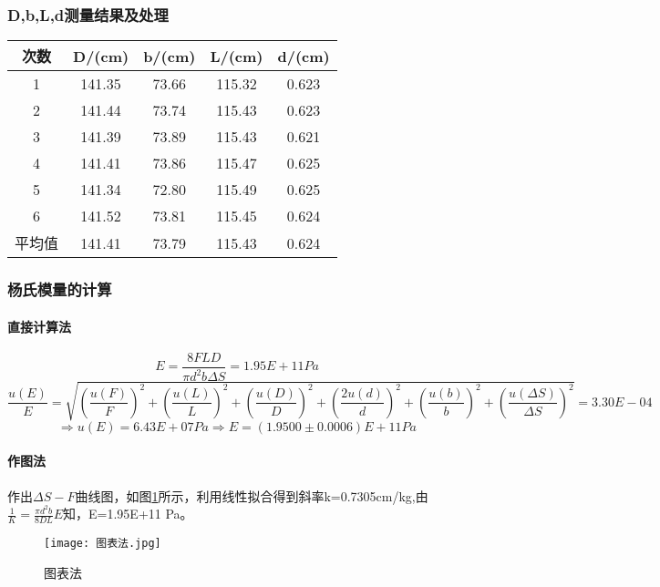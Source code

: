 \documentclass[]{../template/Report}%
\begin{document}
\begin{fullreportonly}
\subsubsection{D,b,L,d测量结果及处理}
	\begin{table}[H]
		\centering
		\label{tab:exp_data}
		\begin{tabular}{|c|c|c|c|c|}
			\hline
			\textbf{次数} & \textbf{D/(cm)} & \textbf{b/(cm)} & \textbf{L/(cm)} & \textbf{d/(cm)} \\
			\hline
			1 & 141.35 & 73.66 & 115.32 & 0.623 \\
			\hline
			2 & 141.44 & 73.74 & 115.43 & 0.623 \\
			\hline
			3 & 141.39 & 73.89 & 115.43 & 0.621 \\
			\hline
			4 & 141.41 & 73.86 & 115.47 & 0.625 \\
			\hline
			5 & 141.34 & 72.80 & 115.49 & 0.625 \\
			\hline
			6 & 141.52 & 73.81 & 115.45 & 0.624 \\
			\hline
			平均值 & 141.41 & 73.79 & 115.43 & 0.624 \\
			\hline
		\end{tabular}
	\end{table}

\subsubsection{杨氏模量的计算}
\paragraph{直接计算法}
\begin{equation}
E=\frac{8FLD}{\pi d^2 b \Delta S}=1.95E+11 Pa
\end{equation}
\begin{equation}
\frac{u(E)}{E}=\sqrt{(\frac{u(F)}{F})^2+(\frac{u(L)}{L})^2+(\frac{u(D)}{D})^2+(\frac{2u(d)}{d})^2+(\frac{u(b)}{b})^2+(\frac{u(\Delta S)}{\Delta S})^2}=3.30E-04
\end{equation}
\begin{equation}
\Rightarrow  u(E)=6.43E+07 Pa
\Rightarrow E=(1.9500\pm0.0006)E+11 Pa
\end{equation}
\paragraph{作图法}
作出$\Delta S-F曲线图$，如图\ref{fig:图表法}所示，利用线性拟合得到斜率k=0.7305cm/kg,由$\frac{1}{K}=\frac{\pi d^2 b}{8DL}E$知，E=1.95E+11 Pa。
\begin{figure}[H]
    \centering
    \texttt{[image: 图表法.jpg]}
    \caption{图表法}
    \label{fig:图表法}
\end{figure}

\end{fullreportonly}
\end{document}
